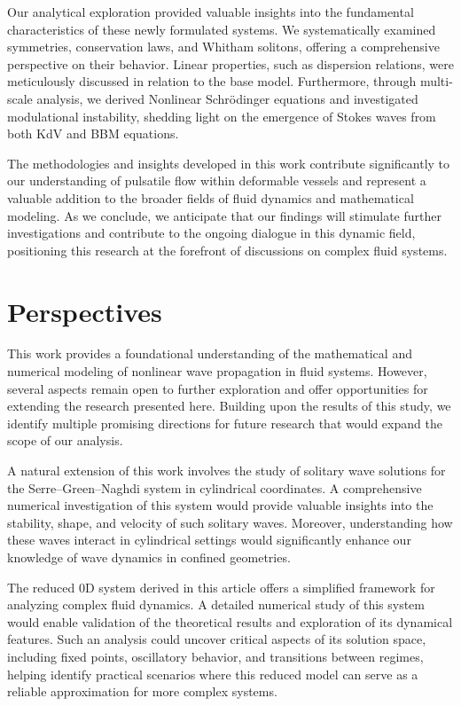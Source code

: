 \documentclass[alpha-refs, 12pt]{wiley-article}
\begin{document}
Our analytical exploration provided valuable insights into the fundamental characteristics of these newly formulated systems. We systematically examined symmetries, conservation laws, and Whitham solitons, offering a comprehensive perspective on their behavior. Linear properties, such as dispersion relations, were meticulously discussed in relation to the base model. Furthermore, through multi-scale analysis, we derived Nonlinear Schrödinger equations and investigated modulational instability, shedding light on the emergence of Stokes waves from both KdV and BBM equations.

The methodologies and insights developed in this work contribute significantly to our understanding of pulsatile flow within deformable vessels and represent a valuable addition to the broader fields of fluid dynamics and mathematical modeling. As we conclude, we anticipate that our findings will stimulate further investigations and contribute to the ongoing dialogue in this dynamic field, positioning this research at the forefront of discussions on complex fluid systems.

\section{Perspectives}\label{sec:perspectives}

This work provides a foundational understanding of the mathematical and numerical modeling of nonlinear wave propagation in fluid systems. However, several aspects remain open to further exploration and offer opportunities for extending the research presented here. Building upon the results of this study, we identify multiple promising directions for future research that would expand the scope of our analysis.

A natural extension of this work involves the study of solitary wave solutions for the Serre--Green--Naghdi system in cylindrical coordinates. A comprehensive numerical investigation of this system would provide valuable insights into the stability, shape, and velocity of such solitary waves. Moreover, understanding how these waves interact in cylindrical settings would significantly enhance our knowledge of wave dynamics in confined geometries.

The reduced 0D system derived in this article offers a simplified framework for analyzing complex fluid dynamics. A detailed numerical study of this system would enable validation of the theoretical results and exploration of its dynamical features. Such an analysis could uncover critical aspects of its solution space, including fixed points, oscillatory behavior, and transitions between regimes, helping identify practical scenarios where this reduced model can serve as a reliable approximation for more complex systems.
\end{document}
